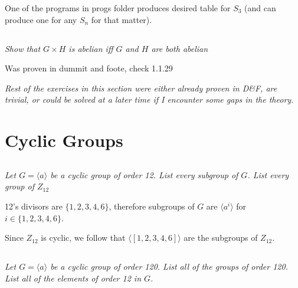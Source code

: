 \documentclass[11pt,oneside,titlepage]{book}
\newcommand{\eangle}[1]{\langle #1 \rangle}
\newcommand{\set}[1]{\{ #1 \}}
\begin{document}
One of the programs in progs folder produces desired table for $S_3$ (and can
produce one for any $S_n$ for that matter).

\subsection{}

\textit{Show that $G \times H$ is abelian iff $G$ and $H$ are both abelian}

Was proven in dummit and foote, check 1.1.29

\textit{Rest of the exercises in this section were either already proven in D\&F, are trivial, or
could be solved at a later time if I encounter some gaps in the theory.}

\section{}
\section{}
\section{}

\section{Cyclic Groups}

\subsection{}

\textit{Let $G = \eangle{a}$ be a cyclic group of order 12. List every subgroup of $G$.
List every group of $Z_{12}$}

12's divisors are $\set{1, 2, 3, 4, 6}$, therefore subgroups of $G$ are
$\eangle{a^i}$ for $i \in \set{1, 2, 3, 4, 6}$.

Since $Z_{12}$ is cyclic, we follow that  $\eangle{[1, 2, 3, 4, 6]}$
are the subgroups of $Z_{12}$.

\subsection{}

\textit{Let $G = \eangle{a}$ be a cyclic group of order 120. List all of the groups of order 120.
List all of the elements of order 12 in $G$. }
\end{document}

